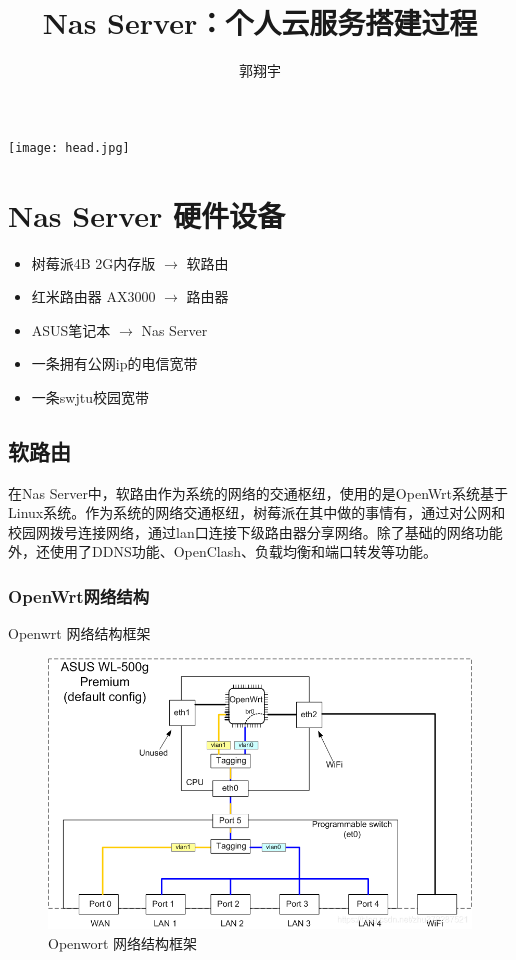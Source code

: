 \documentclass[cn,hazy,blue,10.5pt,normal]{elegantnote}
\title{Nas Server：个人云服务搭建过程}
\author{郭翔宇}
\institute{\LaTeX{} Program}
\date{\zhtoday}
\begin{document}
\maketitle

\centerline{
  \texttt{[image: head.jpg]}
}

\newpage
\section{Nas Server 硬件设备}

\begin{itemize}
  \item 树莓派4B 2G内存版 $\rightarrow$ 软路由
  \item 红米路由器 AX3000 $\rightarrow$ 路由器
  \item ASUS笔记本 $\rightarrow$ Nas Server
  \item 一条拥有公网ip的电信宽带
  \item 一条swjtu校园宽带
\end{itemize}

\subsection{软路由}

在Nas Server中，软路由作为系统的网络的交通枢纽，使用的是OpenWrt系统基于Linux系统。作为系统的网络交通枢纽，树莓派在其中做的事情有，通过对公网和校园网拨号连接网络，通过lan口连接下级路由器分享网络。除了基础的网络功能外，还使用了DDNS功能、OpenClash、负载均衡和端口转发等功能。

\subsubsection{OpenWrt网络结构}

Openwrt 网络结构框架

\begin{figure}[htbp]
  \centering
  \includegraphics[scale=0.45]{image/OpenWrt.png}
  \small
  \caption{Openwort 网络结构框架}\label{fig:1.1}
\end{figure}
\end{document}

